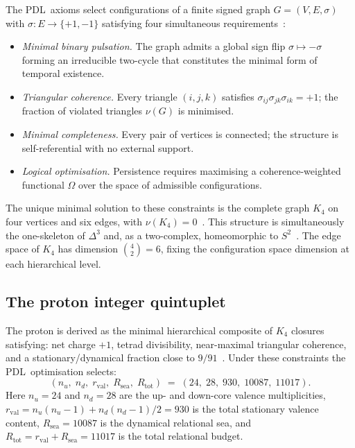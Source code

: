 \documentclass[11pt,a4paper]{article}
\theoremstyle{definition}
\newcommand{\PDL}{\textnormal{PDL}}
\newcommand{\Rsea}{R_{\mathrm{sea}}}
\newcommand{\Rtot}{R_{\mathrm{tot}}}
\newcommand{\rval}{r_{\mathrm{val}}}
\begin{document}
The \PDL\ axioms select configurations of a finite signed graph $G = (V, E, \sigma)$ with $\sigma : E \to \{+1, -1\}$ satisfying four simultaneous requirements~\cite{PDL_Main_2026}:
\begin{itemize}
  \item \emph{Minimal binary pulsation.} The graph admits a global sign flip
    $\sigma \mapsto -\sigma$ forming an irreducible two-cycle that constitutes
    the minimal form of temporal existence.
  \item \emph{Triangular coherence.} Every triangle $(i,j,k)$ satisfies
    $\sigma_{ij}\sigma_{jk}\sigma_{ik} = +1$; the fraction of violated triangles
    $\nu(G)$ is minimised.
  \item \emph{Minimal completeness.} Every pair of vertices is connected;
    the structure is self-referential with no external support.
  \item \emph{Logical optimisation.} Persistence requires maximising a
    coherence-weighted functional $\Omega$ over the space of admissible
    configurations.
\end{itemize}
The unique minimal solution to these constraints is the complete graph $K_4$ on four vertices and six edges, with $\nu(K_4) = 0$~\cite{PDL_Main_2026,Minimal_Stationary_Closures_2026}. This structure is simultaneously the one-skeleton of $\Delta^3$ and, as a two-complex, homeomorphic to $S^2$~\cite{Topology_18_PDL_2026}. The edge space of $K_4$ has dimension $\binom{4}{2} = 6$, fixing the configuration space dimension at each hierarchical level.

\subsection{The proton integer quintuplet}
\label{subsec:quintuplet}

The proton is derived as the minimal hierarchical composite of $K_4$ closures satisfying: net charge $+1$, tetrad divisibility, near-maximal triangular coherence, and a stationary/dynamical fraction close to $9/91$~\cite{Combinatorial_Proton_v2_2026}. Under these constraints the \PDL\ optimisation selects:
\begin{equation}
  \label{eq:quintuplet}
  (n_u,\; n_d,\; \rval,\; \Rsea,\; \Rtot) \;=\; (24,\; 28,\; 930,\; 10087,\; 11017).
\end{equation}
Here $n_u = 24$ and $n_d = 28$ are the up- and down-core valence multiplicities, $\rval = n_u(n_u-1) + n_d(n_d-1)/2 = 930$ is the total stationary valence content, $\Rsea = 10087$ is the dynamical relational sea, and $\Rtot = \rval + \Rsea = 11017$ is the total relational budget.
\end{document}
